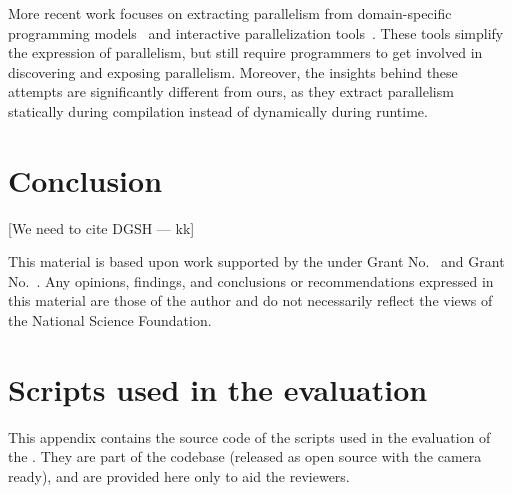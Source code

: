 \documentclass[sigplan,10pt,review,anonymous]{acmart}
\newcommand{\kk}[1]{[{\color{magenta}#1 --- kk}]}
\begin{document}
More recent work focuses on extracting parallelism from domain-specific programming models~\cite{cilk5, streamIt, galois} and interactive parallelization tools~\cite{parascope, ipat}.
These tools simplify the expression of parallelism, but still require programmers to get involved in discovering and exposing parallelism.
Moreover, the insights behind these attempts are significantly different from ours, as they extract parallelism statically during compilation instead of dynamically during runtime.


\section{Conclusion}
\label{discussion}

\kk{We need to cite DGSH}

\begin{acks}
  This material is based upon work supported by the
   under Grant
  No.~ and Grant
  No.~.  Any opinions, findings, and
  conclusions or recommendations expressed in this material are those
  of the author and do not necessarily reflect the views of the
  National Science Foundation.
\end{acks}





\appendix
\section{Scripts used in the evaluation}

This appendix contains the source code of the scripts used in the evaluation of
the \sys. They are part of the codebase (released as open source with the camera
ready), and are provided here only to aid the reviewers.
\end{document}
